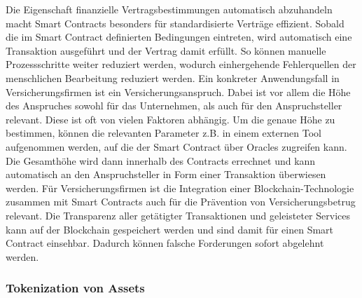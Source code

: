 Die Eigenschaft finanzielle Vertragsbestimmungen automatisch abzuhandeln macht Smart Contracts 
besonders für standardisierte Verträge effizient. Sobald die im Smart Contract definierten Bedingungen
eintreten, wird automatisch eine Transaktion ausgeführt und der Vertrag damit erfüllt.
So können manuelle Prozessschritte weiter reduziert werden, wodurch einhergehende Fehlerquellen
der menschlichen Bearbeitung reduziert werden. 
Ein konkreter Anwendungsfall in Versicherungsfirmen ist ein Versicherungsanspruch.
\cite[p.~168f]{chowdhary2025smart}
Dabei ist vor allem die Höhe des Anspruches sowohl für das Unternehmen, als auch für den
Anspruchsteller relevant. Diese ist oft von vielen Faktoren abhängig. Um die genaue Höhe zu bestimmen,
können die relevanten Parameter z.B. in einem externen Tool aufgenommen werden, auf die der Smart Contract
über Oracles zugreifen kann. Die Gesamthöhe wird dann innerhalb des Contracts errechnet und kann automatisch
an den Anspruchsteller in Form einer Transaktion überwiesen werden. 
Für Versicherungsfirmen ist die Integration einer Blockchain-Technologie zusammen mit Smart Contracts
auch für die Prävention von Versicherungsbetrug relevant. Die Transparenz aller getätigter Transaktionen
und geleisteter Services kann auf der Blockchain gespeichert werden und sind damit für einen Smart Contract
einsehbar. Dadurch können falsche Forderungen sofort abgelehnt werden.
\cite[p.~10]{chenthara2021privacy}






\subsubsection{Tokenization von Assets}
\label{sec:Tokenization}







